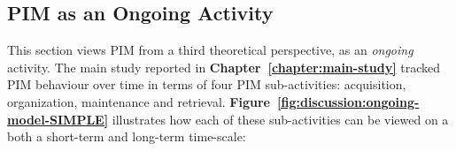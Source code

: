 
\subsection{PIM as an Ongoing Activity}
\label{discussion:ongoing}
This section views PIM from a third theoretical perspective, as an \textit{ongoing} activity.
The main study reported in \textbf{Chapter~\ref{chapter:main-study}} tracked PIM behaviour over time in terms of four PIM sub-activities: acquisition, organization, maintenance and retrieval. \textbf{Figure~\ref{fig:discussion:ongoing-model-SIMPLE}} illustrates how each of these sub-activities can be viewed on a both a short-term and long-term time-scale:

